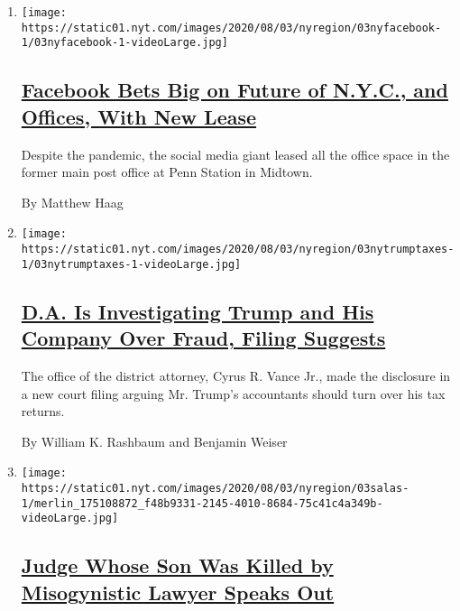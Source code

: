 \begin{enumerate}
\def\labelenumi{\arabic{enumi}.}
\item
  \texttt{[image: https://static01.nyt.com/images/2020/08/03/nyregion/03nyfacebook-1/03nyfacebook-1-videoLarge.jpg]}

  \hypertarget{facebook-bets-big-on-future-of-nyc-and-offices-with-new-lease}{%
  \subsection{\texorpdfstring{\href{/2020/08/03/nyregion/facebook-nyc-office-farley-building.html}{Facebook
  Bets Big on Future of N.Y.C., and Offices, With New
  Lease}}{Facebook Bets Big on Future of N.Y.C., and Offices, With New Lease}}\label{facebook-bets-big-on-future-of-nyc-and-offices-with-new-lease}}

  Despite the pandemic, the social media giant leased all the office
  space in the former main post office at Penn Station in Midtown.

  By Matthew Haag
\item
  \texttt{[image: https://static01.nyt.com/images/2020/08/03/nyregion/03nytrumptaxes-1/03nytrumptaxes-1-videoLarge.jpg]}

  \hypertarget{da-is-investigating-trump-and-his-company-over-fraud-filing-suggests}{%
  \subsection{\texorpdfstring{\href{/2020/08/03/nyregion/donald-trump-taxes-cyrus-vance.html}{D.A.
  Is Investigating Trump and His Company Over Fraud, Filing
  Suggests}}{D.A. Is Investigating Trump and His Company Over Fraud, Filing Suggests}}\label{da-is-investigating-trump-and-his-company-over-fraud-filing-suggests}}

  The office of the district attorney, Cyrus R. Vance Jr., made the
  disclosure in a new court filing arguing Mr. Trump's accountants
  should turn over his tax returns.

  By William K. Rashbaum and Benjamin Weiser
\item
  \texttt{[image: https://static01.nyt.com/images/2020/08/03/nyregion/03salas-1/merlin\_175108872\_f48b9331-2145-4010-8684-75c41c4a349b-videoLarge.jpg]}

  \hypertarget{judge-whose-son-was-killed-by-misogynistic-lawyer-speaks-out}{%
  \subsection{\texorpdfstring{\href{/2020/08/03/nyregion/esther-salas-roy-den-hollander.html}{Judge
  Whose Son Was Killed by Misogynistic Lawyer Speaks
  Out}}{Judge Whose Son Was Killed by Misogynistic Lawyer Speaks Out}}\label{judge-whose-son-was-killed-by-misogynistic-lawyer-speaks-out}}


\end{enumerate}
